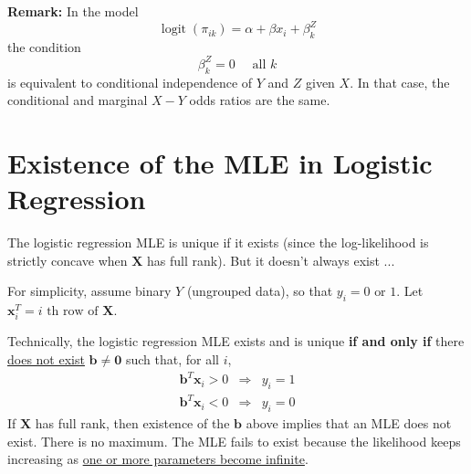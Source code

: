 \documentclass[11pt]{elegantbook}
\begin{document}
\textbf{Remark:} In the model
$$
\operatorname{logit}\left(\pi_{i k}\right)=\alpha+\beta x_i+\beta_k^Z
$$
the condition
$$
\beta_k^Z=0 \quad \text { all } k
$$
is equivalent to conditional independence of $Y$ and $Z$ given $X$.
In that case, the conditional and marginal $X-Y$ odds ratios are the same.


\section{Existence of the MLE in Logistic Regression}
The logistic regression MLE is unique if it exists (since the log-likelihood is strictly concave when $\boldsymbol{X}$ has full rank). But it doesn't always exist ...

For simplicity, assume binary $Y$ (ungrouped data), so that $y_i=0 \text { or } 1$. Let $\boldsymbol{x}_i^T=i \text { th row of } \boldsymbol{X}$.

Technically, the logistic regression MLE exists and is unique \textbf{if and only if} there \underline{does not exist} $\boldsymbol{b} \neq \mathbf{0}$ such that, for all $i$,
$$
\begin{array}{rlr}
    \boldsymbol{b}^T \boldsymbol{x}_i>0 & \Rightarrow & y_i=1 \\
    \boldsymbol{b}^T \boldsymbol{x}_i<0 & \Rightarrow & y_i=0
\end{array}
$$
If $\boldsymbol{X}$ has full rank, then existence of the $\boldsymbol{b}$ above implies that an MLE does not exist. There is no maximum. The MLE fails to exist because the likelihood keeps increasing as \underline{one or more parameters become infinite}.
\end{document}
